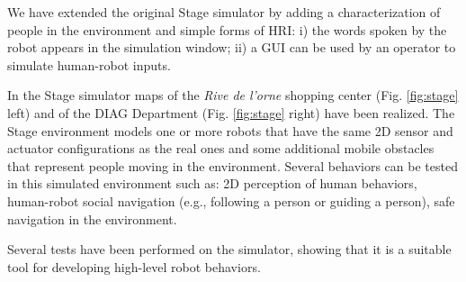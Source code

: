 We have extended the original Stage simulator by adding a characterization of people in the environment and simple forms of HRI: i) the words spoken by the robot appears in the simulation window; ii) a GUI can be used by an operator to simulate human-robot inputs.


In the Stage simulator maps of the \emph{Rive de l'orne} shopping center (Fig. \ref{fig:stage} left) and of the DIAG Department (Fig. \ref{fig:stage} right) have been realized.
The Stage environment models one or more robots that have the same 2D sensor and actuator configurations as the real ones and some additional mobile obstacles that represent people moving in the environment. Several behaviors can be tested in this simulated environment such as: 2D perception of human behaviors, human-robot social navigation (e.g., following a person or guiding a person), safe navigation in the environment.

Several tests have been performed on the simulator, showing that it is a suitable tool for developing high-level robot behaviors. 


